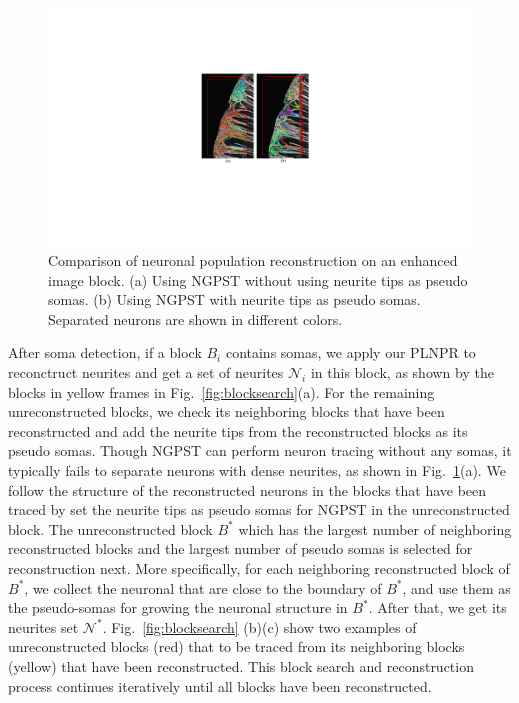 \begin{figure}[t]
	\centering
	\includegraphics[width=0.9\columnwidth]{./Illustrations/ngpst_pseudosoma.pdf}
	\caption{Comparison of neuronal population reconstruction on an enhanced image block. (a) Using NGPST without using neurite tips as pseudo somas. (b) Using NGPST with neurite tips as pseudo somas. Separated neurons are shown in different colors. 
		 }
	\label{fig:ngpst_pseudosoma}
\end{figure}

%
After soma detection, if a block $B_{i}$ contains somas, we apply our PLNPR to reconctruct neurites and get a set of neurites $\mathcal{N}_{i}$ in this block, as shown by the blocks in yellow frames in Fig.~\ref{fig:blocksearch}(a).
%
For the remaining unreconstructed blocks, we check its neighboring blocks that have been reconstructed and add the neurite tips from the reconstructed blocks as its pseudo somas. 
%
Though NGPST can perform neuron tracing without any somas, it typically fails to separate neurons with dense neurites, as shown in Fig.~\ref{fig:ngpst_pseudosoma}(a).
%
We follow the structure of the reconstructed neurons in the blocks that have been traced by set the neurite tips as pseudo somas for NGPST in the unreconstructed block.
%
The unreconstructed block $B^*$ which has the largest number of neighboring reconstructed blocks and the largest number of pseudo somas is selected for reconstruction next.
%
More specifically, for each neighboring reconstructed block of $ B^*$, we collect the neuronal  that are close to the boundary of $ B^* $, and use them as the pseudo-somas for growing the neuronal structure in $B^*$.
After that, we get its neurites set $ \mathcal{N}^* $.
Fig.~\ref{fig:blocksearch} (b)(c) show two examples of unreconstructed blocks (red) that to be traced from its neighboring blocks (yellow) that have been reconstructed. 
%
This block search and reconstruction process continues iteratively until all blocks have been reconstructed.
%

